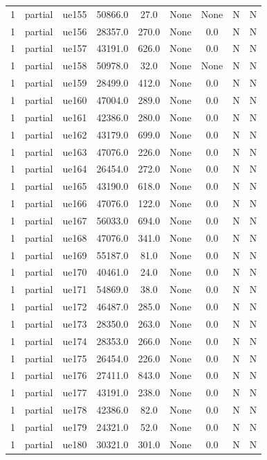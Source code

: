 \begin{table}[ht]
\begin{tabular}{|c|c|c|c|c|c|c|c|c|}
1 & partial & ue155 & 50866.0 & 27.0 & None & None & N & N \\
1 & partial & ue156 & 28357.0 & 270.0 & None & 0.0 & N & N \\
1 & partial & ue157 & 43191.0 & 626.0 & None & 0.0 & N & N \\
1 & partial & ue158 & 50978.0 & 32.0 & None & None & N & N \\
1 & partial & ue159 & 28499.0 & 412.0 & None & 0.0 & N & N \\
1 & partial & ue160 & 47004.0 & 289.0 & None & 0.0 & N & N \\
1 & partial & ue161 & 42386.0 & 280.0 & None & 0.0 & N & N \\
1 & partial & ue162 & 43179.0 & 699.0 & None & 0.0 & N & N \\
1 & partial & ue163 & 47076.0 & 226.0 & None & 0.0 & N & N \\
1 & partial & ue164 & 26454.0 & 272.0 & None & 0.0 & N & N \\
1 & partial & ue165 & 43190.0 & 618.0 & None & 0.0 & N & N \\
1 & partial & ue166 & 47076.0 & 122.0 & None & 0.0 & N & N \\
1 & partial & ue167 & 56033.0 & 694.0 & None & 0.0 & N & N \\
1 & partial & ue168 & 47076.0 & 341.0 & None & 0.0 & N & N \\
1 & partial & ue169 & 55187.0 & 81.0 & None & 0.0 & N & N \\
1 & partial & ue170 & 40461.0 & 24.0 & None & 0.0 & N & N \\
1 & partial & ue171 & 54869.0 & 38.0 & None & 0.0 & N & N \\
1 & partial & ue172 & 46487.0 & 285.0 & None & 0.0 & N & N \\
1 & partial & ue173 & 28350.0 & 263.0 & None & 0.0 & N & N \\
1 & partial & ue174 & 28353.0 & 266.0 & None & 0.0 & N & N \\
1 & partial & ue175 & 26454.0 & 226.0 & None & 0.0 & N & N \\
1 & partial & ue176 & 27411.0 & 843.0 & None & 0.0 & N & N \\
1 & partial & ue177 & 43191.0 & 238.0 & None & 0.0 & N & N \\
1 & partial & ue178 & 42386.0 & 82.0 & None & 0.0 & N & N \\
1 & partial & ue179 & 24321.0 & 52.0 & None & 0.0 & N & N \\
1 & partial & ue180 & 30321.0 & 301.0 & None & 0.0 & N & N \\

\end{tabular}
\end{table}
